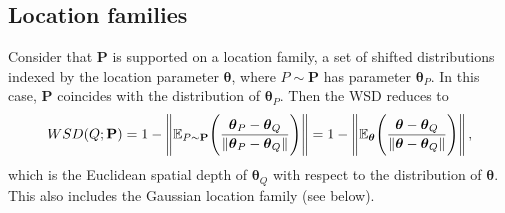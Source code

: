 \documentclass{imsart}
\numberwithin{equation}{section}
\def\E{\mathbb{E}}
\def\E{\mathbb E}
\begin{document}
\subsection{Location families}
Consider that $\mathbf{P}$ is supported on a location family, a set of shifted distributions indexed by the location parameter $\boldsymbol{\theta}$, where $P \sim \mathbf{P}$ has parameter $\boldsymbol{\theta}_P$. 
In this case, $\mathbf{P}$ coincides with the distribution of $\boldsymbol{\theta}_P$. Then the WSD reduces to
\begin{equation}\label{spatial_depth}
	{\rm WSD}(Q; {\bf P})= 1- \left\|\E_{P\sim \mathbf{P}}  \Bigg( \frac{\boldsymbol{\theta}_P-\boldsymbol{\theta}_Q }{\|\boldsymbol{\theta}_P-\boldsymbol{\theta}_Q\|} \Bigg) \right\| = 1- \left\|\E_{\boldsymbol{\theta}}  \Bigg( \frac{\boldsymbol{\theta}-\boldsymbol{\theta}_Q }{\|\boldsymbol{\theta}-\boldsymbol{\theta}_Q\|} \Bigg) \right\|,
\end{equation}
which is the Euclidean spatial depth of $\boldsymbol{\theta}_Q$ with respect to the distribution of $\boldsymbol{\theta}$. This also includes the Gaussian location family (see below). 
\end{document}
